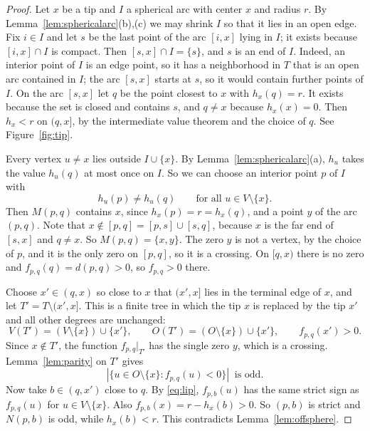 \documentclass[11pt]{amsart}
\theoremstyle{definition}
\theoremstyle{remark}
\newcommand{\M}{M}
\newcommand{\Odd}{O}
\newcommand{\Ver}{V}
\newcommand{\N}{N}
\begin{document}
\begin{proof}
Let $x$ be a tip and $I$ a spherical arc with center $x$ and radius $r$. By Lemma~\ref{lem:sphericalarc}(b),(c) we may shrink $I$ so that it lies in an open edge. Fix $i\in I$ and let $s$ be the last point of the arc $[i,x]$ lying in $I$; it exists because $[i,x]\cap I$ is compact. Then $[s,x]\cap I=\{s\}$, and $s$ is an end of $I$. Indeed, an interior point of $I$ is an edge point, so it has a neighborhood in $T$ that is an open arc contained in $I$; the arc $[s,x]$ starts at $s$, so it would contain further points of $I$. On the arc $[s,x]$ let $q$ be the point closest to $x$ with $h_x(q)=r$. It exists because the set is closed and contains $s$, and $q\ne x$ because $h_x(x)=0$. Then $h_x<r$ on $(q,x]$, by the intermediate value theorem and the choice of $q$. See Figure~\ref{fig:tip}.

Every vertex $u\ne x$ lies outside $I\cup\{x\}$. By Lemma~\ref{lem:sphericalarc}(a), $h_u$ takes the value $h_u(q)$ at most once on $I$. So we can choose an interior point $p$ of $I$ with
\[
  h_u(p)\ne h_u(q)\qquad\text{for all } u\in\Ver\setminus\{x\}.
\]
Then $\M(p,q)$ contains $x$, since $h_x(p)=r=h_x(q)$, and a point $y$ of the arc $(p,q)$. Note that $x\notin[p,q]=[p,s]\cup[s,q]$, because $x$ is the far end of $[s,x]$ and $q\ne x$. So $\M(p,q)=\{x,y\}$. The zero $y$ is not a vertex, by the choice of $p$, and it is the only zero on $[p,q]$, so it is a crossing. On $[q,x)$ there is no zero and $f_{p,q}(q)=d(p,q)>0$, so $f_{p,q}>0$ there.

Choose $x'\in(q,x)$ so close to $x$ that $(x',x]$ lies in the terminal edge of $x$, and let $T'=T\setminus(x',x]$. This is a finite tree in which the tip $x$ is replaced by the tip $x'$ and all other degrees are unchanged:
\[
  \Ver(T')=(\Ver\setminus\{x\})\cup\{x'\},\qquad \Odd(T')=(\Odd\setminus\{x\})\cup\{x'\},\qquad f_{p,q}(x')>0 .
\]
Since $x\notin T'$, the function $f_{p,q}|_{T'}$ has the single zero $y$, which is a crossing. Lemma~\ref{lem:parity} on $T'$ gives
\[
  |\{u\in\Odd\setminus\{x\}: f_{p,q}(u)<0\}|\ \text{ is odd.}
\]
Now take $b\in(q,x')$ close to $q$. By \eqref{eq:lip}, $f_{p,b}(u)$ has the same strict sign as $f_{p,q}(u)$ for $u\in\Ver\setminus\{x\}$. Also $f_{p,b}(x)=r-h_x(b)>0$. So $(p,b)$ is strict and $\N(p,b)$ is odd, while $h_x(b)<r$. This contradicts Lemma~\ref{lem:offsphere}.
\end{proof}
\end{document}

